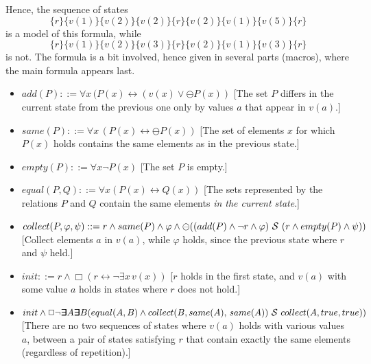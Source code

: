 \documentclass{llncs}
\newcommand{\Exists}{\bm{\exists}\kern-0.6em\bm{\exists}}
\begin{document}

Hence, the sequence of states 
\[ \{ r \} \{ v(1) \}  \{ v(2) \}  \{ v(2) \}  \{ r\}  \{ v(2) \}  \{  v(1) \}  \{  v(5) \}  \{  r \}\]
is a model of this formula, while 
\[ \{ r \} \{ v(1) \}  \{ v(2) \} \{ v(3) \}  \{ r\}  \{ v(2) \}  \{  v(1) \}  \{  v(3) \} \{  r \} \]
is not.
The \QFLTL{} formula is a bit involved, hence given in several parts (macros), where the main formula appears last.

\begin{itemize}
\item $add(P) ::= \forall x \, (P(x) \leftrightarrow (v(x) \vee \ominus P(x))$ [The set $P$ differs in the current state from the previous one only by values $a$ that appear in $v(a)$.]
\item $same(P) ::= \forall x \, (P(x) \leftrightarrow \ominus P(x))$ 
[The set of elements $x$ for which
$P (x)$ holds
contains the same elements as in the previous state.]
\item $empty (P) ::= \forall x \neg P(x)$ [The set $P$ is empty.]
\item $equal (P,Q) ::= \forall x (P(x) \leftrightarrow Q(x))$ 
[The sets represented by the relations
$P$ and $Q$ contain the same elements {\em in the current state}.]
\item $collect(P, \varphi, \psi) ::=
       r \wedge same(P) \wedge \varphi \wedge 
       \ominus ((add(P)\wedge \neg r \wedge \varphi) \ {\cal S} \ (r \wedge empty(P) \wedge \psi))$  [Collect elements $a$ in $v(a)$, while $\varphi$ holds, 
       since the previous state where $r$ 
       and $\psi$ held.]
\item $init ::= r \wedge \Box (r \leftrightarrow \neg \exists x \, v(x))$ [$r$ holds in the first state, and $v(a)$ with some value $a$ holds in states where $r$ does not hold.]
\item $init \wedge \Box \neg \Exists A \Exists B (equal (A, B) \wedge \\
collect(B, same(A),\, same(A)) \ \since \ collect(A, true, true))$
[There are no two sequences of states where $v(a)$ holds
with various values $a$, between a pair of states satisfying $r$ that contain exactly the same elements (regardless of repetition).]
\end{itemize}


\end{document}
